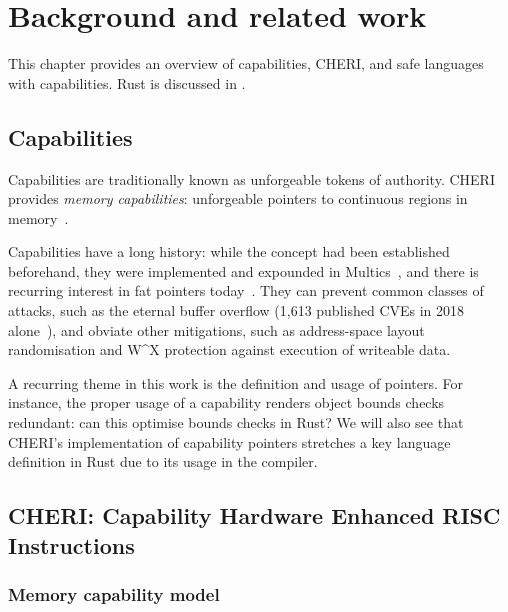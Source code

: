 \documentclass[dissertation.tex]{subfiles}
\begin{document}
\chapter{Background and related work}
\label{ch:bg}



 This chapter provides an overview of capabilities, CHERI,
and safe languages with capabilities.
Rust is discussed in .


\section{Capabilities}
\label{sec:bg-caps}
Capabilities are traditionally known as unforgeable tokens of authority.
CHERI provides \emph{memory capabilities}: unforgeable pointers to
continuous regions in memory~\cite{cheri-risc-2014}.

Capabilities have a long history: while the concept had been established
beforehand, they were implemented and expounded in
Multics~\cite{bell-lapadula}, and there is recurring interest in fat
pointers today~\cite{devietti-hardbound,lowfat-kwon}.
They can prevent common classes of attacks, such as the
eternal buffer overflow (1,613 published CVEs in 2018
alone~\cite{nist-nvd-overflow-2018}), and obviate other mitigations,
such as address-space layout randomisation and W\^{}X protection
against execution of writeable data.

A recurring theme in this work is the definition and usage of pointers.
For instance, the proper usage of a capability renders object bounds
checks redundant: can this optimise bounds checks in Rust?
We will also see that CHERI's implementation of capability pointers
stretches a key language definition in Rust due to its usage in the
compiler.


\section{CHERI: Capability Hardware Enhanced RISC Instructions}


\subsection{Memory capability model}
\end{document}
